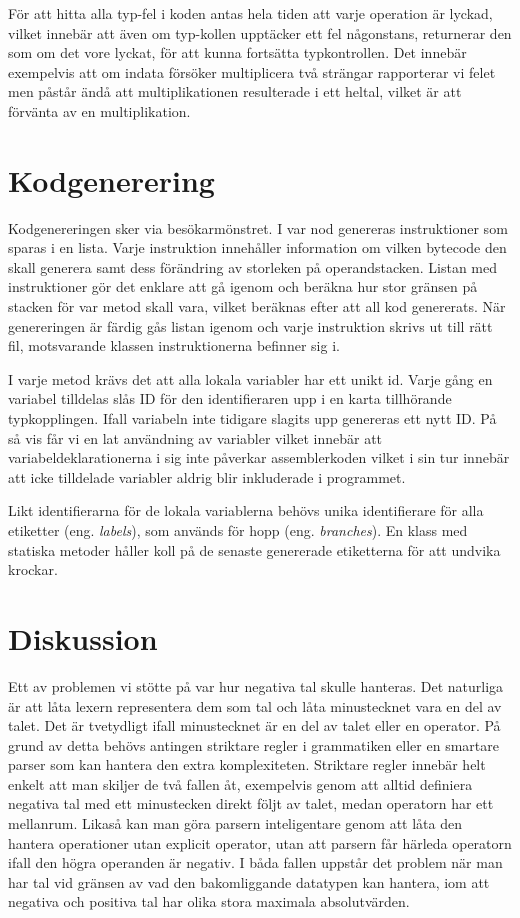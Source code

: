 \documentclass[a4paper,11pt]{article}
\newcommand{\trans}[2][eng.]{(#1 \emph{#2})}
\renewcommand{\*}[0]{\cdot}
\begin{document}
För att hitta alla typ-fel i koden antas hela tiden att varje operation är
lyckad, vilket innebär att även om typ-kollen upptäcker ett fel någonstans,
returnerar den som om det vore lyckat, för att kunna fortsätta typkontrollen.
Det innebär exempelvis att om indata försöker multiplicera två strängar
rapporterar vi felet men påstår ändå att multiplikationen resulterade i ett
heltal, vilket är att förvänta av en multiplikation.

\section*{Kodgenerering}

Kodgenereringen sker via besökarmönstret. I var nod genereras instruktioner som
sparas i en lista. Varje instruktion innehåller information om vilken bytecode
den skall generera samt dess förändring av storleken på operandstacken. Listan
med instruktioner gör det enklare att gå igenom och beräkna hur stor gränsen på
stacken för var metod skall vara, vilket beräknas efter att all kod genererats.
När genereringen är färdig gås listan igenom och varje instruktion skrivs ut
till rätt fil, motsvarande klassen instruktionerna befinner sig i.

I varje metod krävs det att alla lokala variabler har ett unikt id. Varje gång
en variabel tilldelas slås ID för den identifieraren upp i en karta tillhörande
typkopplingen. Ifall variabeln inte tidigare slagits upp genereras ett nytt ID.
På så vis får vi en lat användning av variabler vilket innebär att
variabeldeklarationerna i sig inte påverkar assemblerkoden vilket i sin tur
innebär att icke tilldelade variabler aldrig blir inkluderade i programmet.

Likt identifierarna för de lokala variablerna behövs unika identifierare för
alla etiketter \trans{labels}, som används för hopp \trans{branches}. En klass
med statiska metoder håller koll på de senaste genererade etiketterna för att
undvika krockar.

\section*{Diskussion}

Ett av problemen vi stötte på var hur negativa tal skulle hanteras. Det
naturliga är att låta lexern representera dem som tal och låta minustecknet
vara en del av talet. Det är tvetydligt ifall minustecknet är en del av talet
eller en operator. På grund av detta behövs antingen striktare regler i
grammatiken eller en smartare parser som kan hantera den extra komplexiteten.
Striktare regler innebär helt enkelt att man skiljer de två fallen åt,
exempelvis genom att alltid definiera negativa tal med ett minustecken direkt
följt av talet, medan operatorn har ett mellanrum. Likaså kan man göra parsern
inteligentare genom att låta den hantera operationer utan explicit operator,
utan att parsern får härleda operatorn ifall den högra operanden är negativ.
I båda fallen uppstår det problem när man har tal vid gränsen av vad den
bakomliggande datatypen kan hantera, iom att negativa och positiva tal har
olika stora maximala absolutvärden.
\end{document}

